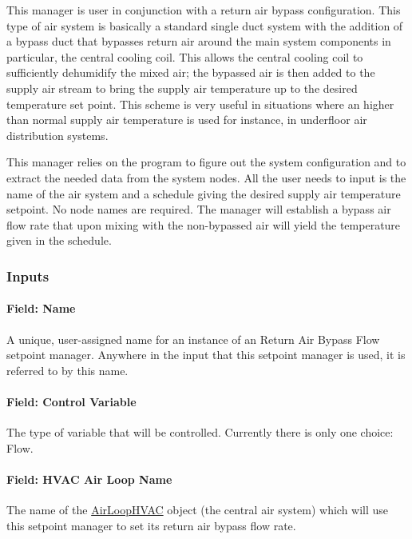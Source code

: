 This manager is user in conjunction with a return air bypass configuration. This type of air system is basically a standard single duct system with the addition of a bypass duct that bypasses return air around the main system components in particular, the central cooling coil. This allows the central cooling coil to sufficiently dehumidify the mixed air; the bypassed air is then added to the supply air stream to bring the supply air temperature up to the desired temperature set point. This scheme is very useful in situations where an higher than normal supply air temperature is used for instance, in underfloor air distribution systems.

This manager relies on the program to figure out the system configuration and to extract the needed data from the system nodes. All the user needs to input is the name of the air system and a schedule giving the desired supply air temperature setpoint. No node names are required. The manager will establish a bypass air flow rate that upon mixing with the non-bypassed air will yield the temperature given in the schedule.

\subsubsection{Inputs}\label{inputs-12-016}

\paragraph{Field: Name}\label{field-name-12-010}

A unique, user-assigned name for an instance of an Return Air Bypass Flow setpoint manager. Anywhere in the input that this setpoint manager is used, it is referred to by this name.

\paragraph{Field: Control Variable}\label{field-control-variable-12}

The type of variable that will be controlled. Currently there is only one choice: Flow.

\paragraph{Field: HVAC Air Loop Name}\label{field-hvac-air-loop-name-2}

The name of the \hyperref[airloophvac]{AirLoopHVAC} object (the central air system) which will use this setpoint manager to set its return air bypass flow rate.

